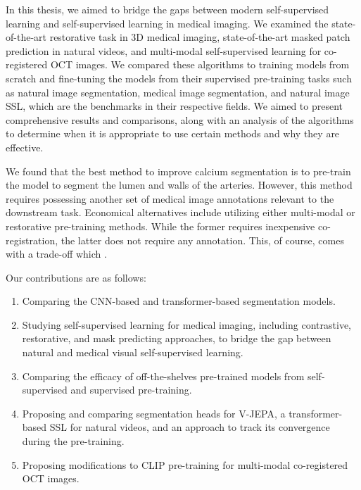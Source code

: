 \documentclass[a4paper,11pt,oneside]{report}
\begin{document}
In this thesis, we aimed to bridge the gaps between modern self-supervised learning and self-supervised learning in medical imaging. We examined the state-of-the-art restorative task in 3D medical imaging, state-of-the-art masked patch prediction in natural videos, and multi-modal self-supervised learning for co-registered OCT images. We compared these algorithms to training models from scratch and fine-tuning the models from their supervised pre-training tasks such as natural image segmentation, medical image segmentation, and natural image SSL, which are the benchmarks in their respective fields. We aimed to present comprehensive results and comparisons, along with an analysis of the algorithms to determine when it is appropriate to use certain methods and why they are effective.

We found that the best method to improve calcium segmentation is to pre-train the model to segment the lumen and walls of the arteries. However, this method requires possessing another set of medical image annotations relevant to the downstream task. Economical alternatives include utilizing either multi-modal or restorative pre-training methods. While the former requires inexpensive co-registration, the latter does not require any annotation. This, of course, comes with a trade-off which .%

Our contributions are as follows:
\begin{enumerate}
    \item Comparing the CNN-based and transformer-based segmentation models.
    \item Studying self-supervised learning for medical imaging, including contrastive, restorative, and mask predicting approaches, to bridge the gap between natural and medical visual self-supervised learning.
    \item Comparing the efficacy of off-the-shelves pre-trained models from self-supervised and supervised pre-training.
    \item Proposing and comparing segmentation heads for V-JEPA, a transformer-based SSL for natural videos, and an approach to track its convergence during the pre-training.
    \item Proposing modifications to CLIP pre-training for multi-modal co-registered OCT images.
\end{enumerate}
\end{document}
